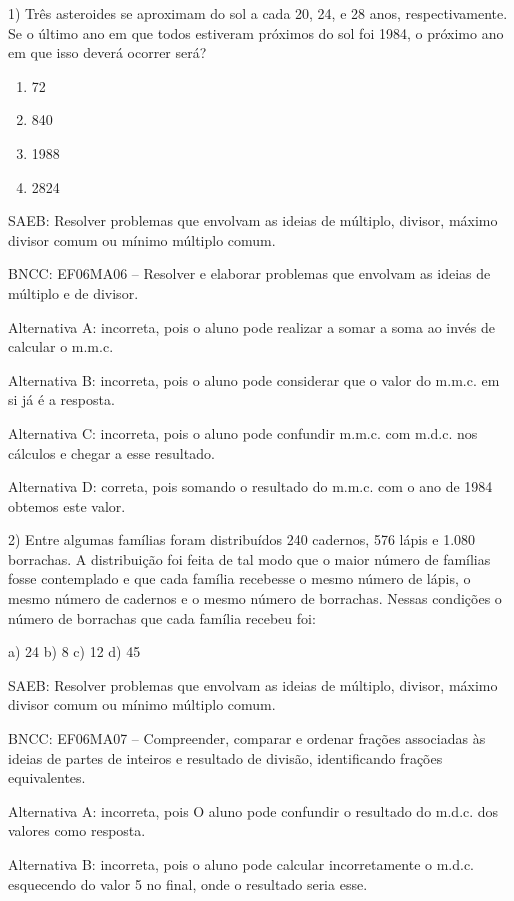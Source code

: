 
1) Três asteroides se aproximam do sol a cada 20, 24, e 28 anos,
respectivamente. Se o último ano em que todos estiveram próximos do sol
foi 1984, o próximo ano em que isso deverá ocorrer será?

\begin{enumerate}
\def\labelenumi{\alph{enumi})}
\item
  72
\item
  840
\item
  1988
\item
  2824
\end{enumerate}

SAEB: Resolver problemas que envolvam as ideias de múltiplo, divisor,
máximo divisor comum ou mínimo múltiplo comum.

BNCC: EF06MA06 -- Resolver e elaborar problemas que envolvam as ideias
de múltiplo e de divisor.

Alternativa A: incorreta, pois o aluno pode realizar a somar a soma ao
invés de calcular o m.m.c.

Alternativa B: incorreta, pois o aluno pode considerar que o valor do
m.m.c. em si já é a resposta.

Alternativa C: incorreta, pois o aluno pode confundir m.m.c. com m.d.c.
nos cálculos e chegar a esse resultado.

Alternativa D: correta, pois somando o resultado do m.m.c. com o ano de
1984 obtemos este valor.

2) Entre algumas famílias foram distribuídos 240 cadernos, 576 lápis e
1.080 borrachas. A distribuição foi feita de tal modo que o maior número
de famílias fosse contemplado e que cada família recebesse o mesmo
número de lápis, o mesmo número de cadernos e o mesmo número de
borrachas. Nessas condições o número de borrachas que cada família
recebeu foi:

a) 24 b) 8 c) 12 d) 45

SAEB: Resolver problemas que envolvam as ideias de múltiplo, divisor,
máximo divisor comum ou mínimo múltiplo comum.

BNCC: EF06MA07 -- Compreender, comparar e ordenar frações associadas às
ideias de partes de inteiros e resultado de divisão, identificando
frações equivalentes.

Alternativa A: incorreta, pois O aluno pode confundir o resultado do
m.d.c. dos valores como resposta.

Alternativa B: incorreta, pois o aluno pode calcular incorretamente o
m.d.c. esquecendo do valor 5 no final, onde o resultado seria esse.

